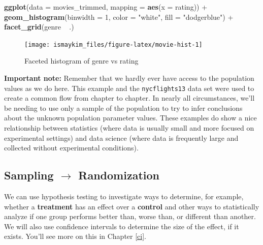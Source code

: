 \documentclass[]{tufte-book}
\newenvironment{Shaded}{\begin{snugshade}}{\end{snugshade}}
\newcommand{\KeywordTok}[1]{\textcolor[rgb]{0.13,0.29,0.53}{\textbf{{#1}}}}
\newcommand{\DataTypeTok}[1]{\textcolor[rgb]{0.13,0.29,0.53}{{#1}}}
\newcommand{\DecValTok}[1]{\textcolor[rgb]{0.00,0.00,0.81}{{#1}}}
\newcommand{\StringTok}[1]{\textcolor[rgb]{0.31,0.60,0.02}{{#1}}}
\newcommand{\NormalTok}[1]{{#1}}
\theoremstyle{definition}
\theoremstyle{definition}
\theoremstyle{remark}
\begin{document}
\begin{Shaded}
\begin{Highlighting}[]
\KeywordTok{ggplot}\NormalTok{(}\DataTypeTok{data =} \NormalTok{movies_trimmed, }\DataTypeTok{mapping =} \KeywordTok{aes}\NormalTok{(}\DataTypeTok{x =} \NormalTok{rating)) +}
\StringTok{  }\KeywordTok{geom_histogram}\NormalTok{(}\DataTypeTok{binwidth =} \DecValTok{1}\NormalTok{, }\DataTypeTok{color =} \StringTok{"white"}\NormalTok{, }\DataTypeTok{fill =} \StringTok{"dodgerblue"}\NormalTok{) +}
\StringTok{  }\KeywordTok{facet_grid}\NormalTok{(genre ~}\StringTok{ }\NormalTok{.)}
\end{Highlighting}
\end{Shaded}

\begin{figure}

{\centering \texttt{[image: ismaykim\_files/figure-latex/movie-hist-1]} 

}

\caption[Faceted histogram of genre vs rating]{Faceted histogram of genre vs rating}\label{fig:movie-hist}
\end{figure}

\textbf{Important note:} Remember that we hardly ever have access to the
population values as we do here. This example and the
\texttt{nycflights13} data set were used to create a common flow from
chapter to chapter. In nearly all circumstances, we'll be needing to use
only a sample of the population to try to infer conclusions about the
unknown population parameter values. These examples do show a nice
relationship between statistics (where data is usually small and more
focused on experimental settings) and data science (where data is
frequently large and collected without experimental conditions).

\subsection{\texorpdfstring{Sampling \(\rightarrow\)
Randomization}{Sampling \textbackslash{}rightarrow Randomization}}\label{sampling-rightarrow-randomization}

We can use hypothesis testing to investigate ways to determine, for
example, whether a \textbf{treatment} has an effect over a
\textbf{control} and other ways to statistically analyze if one group
performs better than, worse than, or different than another. We will
also use confidence intervals to determine the size of the effect, if it
exists. You'll see more on this in Chapter \ref{ci}.
\end{document}
